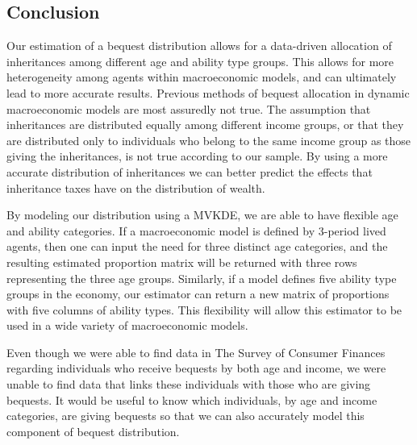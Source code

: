 \documentclass[letterpaper,12pt]{article}
\theoremstyle{definition}
\begin{document}
\begin{spacing}{1.5}
\section{Conclusion}\label{SecConclusion}

  Our estimation of a bequest distribution allows for a data-driven allocation of inheritances among different age and ability type groups. This allows for more heterogeneity among agents within macroeconomic models, and can ultimately lead to more accurate results. Previous methods of bequest allocation in dynamic macroeconomic models are most assuredly not true. The assumption that inheritances are distributed equally among different income groups, or that they are distributed only to individuals who belong to the same income group as those giving the inheritances, is not true according to our sample. By using a more accurate distribution of inheritances we can better predict the effects that inheritance taxes have on the distribution of wealth.

  By modeling our distribution using a MVKDE, we are able to have flexible age and ability categories. If a macroeconomic model is defined by 3-period lived agents, then one can input the need for three distinct age categories, and the resulting estimated proportion matrix will be returned with three rows representing the three age groups. Similarly, if a model defines five ability type groups in the economy, our estimator can return a new matrix of proportions with five columns of ability types. This flexibility will allow this estimator to be used in a wide variety of macroeconomic models.

  Even though we were able to find data in The Survey of Consumer Finances regarding individuals who receive bequests by both age and income, we were unable to find data that links these individuals with those who are giving bequests. It would be useful to know which individuals, by age and income categories, are giving bequests so that we can also accurately model this component of bequest distribution.



\clearpage


\end{spacing}


\newpage



\end{document}

